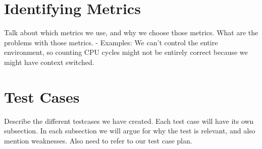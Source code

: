 \section{Identifying Metrics}
Talk about which metrics we use, and why we choose those metrics.
What are the problems with those metrics.
- Examples: We can't control the entire environment, so counting CPU cycles might not be entirely correct because we might have context switched.

\section{Test Cases}
Describe the different testcases we have created. Each test case will have its own subsection.
In each subsection we will argue for why the test is relevant, and also mention weaknesses.
Also need to refer to our test case plan.

